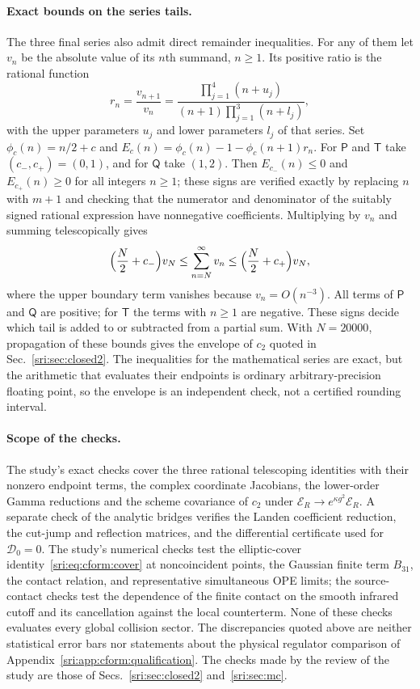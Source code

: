\paragraph{Exact bounds on the series tails.} The three final series also admit direct remainder inequalities. For any
of them let $v_n$ be the absolute value of its $n$th summand, $n\ge1$. Its positive ratio is the rational function
\begin{equation}
 r_n=\frac{v_{n+1}}{v_n}=\frac{\prod_{j=1}^4(n+u_j)}{(n+1)\prod_{j=1}^3(n+l_j)},
\end{equation}
with the upper parameters $u_j$ and lower parameters $l_j$ of that series. Set $\phi_c(n)=n/2+c$ and
$E_c(n)=\phi_c(n)-1-\phi_c(n+1)r_n$. For $\mathsf P$ and $\mathsf T$ take $(c_-,c_+)=(0,1)$, and for $\mathsf Q$ take
$(1,2)$. Then $E_{c_-}(n)\le0$ and $E_{c_+}(n)\ge0$ for all integers $n\ge1$; these signs are verified exactly by
replacing $n$ with $m+1$ and checking that the numerator and denominator of the suitably signed rational expression
have nonnegative coefficients. Multiplying by $v_n$ and summing telescopically gives
\begin{equation}
 \Bigl(\frac N2+c_-\Bigr)v_N\le\sum_{n=N}^\infty v_n\le\Bigl(\frac N2+c_+\Bigr)v_N,
\end{equation}
where the upper boundary term vanishes because $v_n=O(n^{-3})$. All terms of $\mathsf P$ and $\mathsf Q$ are positive;
for $\mathsf T$ the terms with $n\ge1$ are negative. These signs decide which tail is added to or subtracted from a
partial sum. With $N=20000$, propagation of these bounds gives the envelope of $c_2$ quoted in Sec.~\ref{sri:sec:closed2}.
The inequalities for the mathematical series are exact, but the arithmetic that evaluates their endpoints is ordinary
arbitrary-precision floating point, so the envelope is an independent check, not a certified rounding interval.

\paragraph{Scope of the checks.} The study's exact checks cover the three rational telescoping identities with their
nonzero endpoint terms, the complex coordinate Jacobians, the lower-order Gamma reductions and the scheme covariance
of $c_2$ under $\mathcal E_R\to e^{\kappa g^2}\mathcal E_R$. A separate check of the analytic bridges verifies the
Landen coefficient reduction, the cut-jump and reflection matrices, and the differential certificate used for
$\mathcal D_0=0$. The study's numerical checks test the elliptic-cover identity~\eqref{sri:eq:cform:cover} at noncoincident
points,
the Gaussian finite term $B_{31}$, the contact relation, and representative simultaneous OPE limits; the source-contact checks
test the dependence of the finite contact on the smooth infrared cutoff and its cancellation against the local
counterterm. None of these checks evaluates every global collision sector. The discrepancies quoted above are
neither statistical error bars nor statements about the physical regulator comparison of
Appendix~\ref{sri:app:cform:qualification}. The checks made by the review of the study are those of
Secs.~\ref{sri:sec:closed2} and~\ref{sri:sec:mc}.

